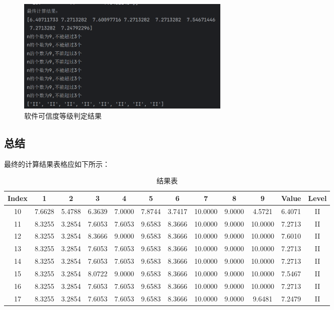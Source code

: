 \documentclass[14pt,a4paper,UTF8,twoside]{article}
\begin{document}
\begin{figure}[H]
	\centering
	\includegraphics[width=0.5\textwidth]{img7/level.png}
	\caption{软件可信度等级判定结果}
\end{figure}

\subsection{总结}

最终的计算结果表格应如下所示：

\begin{table}[H]
	\centering
	\begin{tabular}{c|ccccccccc|c|c}
	\toprule
	\textbf{Index} &\textbf{1} & \textbf{2} & \textbf{3} & \textbf{4} & \textbf{5} & \textbf{6} & \textbf{7} & \textbf{8} & \textbf{9} & \textbf{Value} & \textbf{Level} \\
	\midrule
	10 & 7.6628 & 5.4788 & 6.3639 & 7.0000 & 7.8744 & 3.7417 & 10.0000 & 9.0000 & 4.5721  & 6.4071 & II \\
	11 & 8.3255 & 3.2854 & 7.6053 & 7.6053 & 9.6583 & 8.3666 & 10.0000 & 9.0000 & 10.0000 & 7.2713 & II \\
	12 & 8.3255 & 3.2854 & 8.3666 & 9.0000 & 9.6583 & 8.3666 & 10.0000 & 9.0000 & 10.0000 & 7.6010 & II \\
	13 & 8.3255 & 3.2854 & 7.6053 & 7.6053 & 9.6583 & 8.3666 & 10.0000 & 9.0000 & 10.0000 & 7.2713 & II \\
	14 & 8.3255 & 3.2854 & 7.6053 & 7.6053 & 9.6583 & 8.3666 & 10.0000 & 9.0000 & 10.0000 & 7.2713 & II \\
	15 & 8.3255 & 3.2854 & 8.0722 & 9.0000 & 9.6583 & 8.3666 & 10.0000 & 9.0000 & 10.0000 & 7.5467 & II \\
	16 & 8.3255 & 3.2854 & 7.6053 & 7.6053 & 9.6583 & 8.3666 & 10.0000 & 9.0000 & 10.0000 & 7.2713 & II \\
	17 & 8.3255 & 3.2854 & 7.6053 & 7.6053 & 9.6583 & 8.3666 & 10.0000 & 9.0000 & 9.6481  & 7.2479 & II \\
	\bottomrule
	\end{tabular}
	\caption{结果表}
\end{table}
\end{document}
